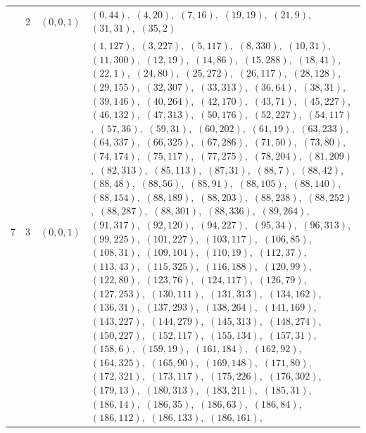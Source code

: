 \documentclass[11pt]{article}
\begin{document}
\begin{longtable}{@{}rrl>{\raggedright\arraybackslash}p{}@{}}
\addlinespace[3pt]
7 & 2 & $(0,0,1)$ & $(0,44)$,\allowbreak\ $(4,20)$,\allowbreak\ $(7,16)$,\allowbreak\ $(19,19)$,\allowbreak\ $(21,9)$,\allowbreak\ $(31,31)$,\allowbreak\ $(35,2)$\\
7 & 3 & $(0,0,1)$ & $(1,127)$,\allowbreak\ $(3,227)$,\allowbreak\ $(5,117)$,\allowbreak\ $(8,330)$,\allowbreak\ $(10,31)$,\allowbreak\ $(11,300)$,\allowbreak\ $(12,19)$,\allowbreak\ $(14,86)$,\allowbreak\ $(15,288)$,\allowbreak\ $(18,41)$,\allowbreak\ $(22,1)$,\allowbreak\ $(24,80)$,\allowbreak\ $(25,272)$,\allowbreak\ $(26,117)$,\allowbreak\ $(28,128)$,\allowbreak\ $(29,155)$,\allowbreak\ $(32,307)$,\allowbreak\ $(33,313)$,\allowbreak\ $(36,64)$,\allowbreak\ $(38,31)$,\allowbreak\ $(39,146)$,\allowbreak\ $(40,264)$,\allowbreak\ $(42,170)$,\allowbreak\ $(43,71)$,\allowbreak\ $(45,227)$,\allowbreak\ $(46,132)$,\allowbreak\ $(47,313)$,\allowbreak\ $(50,176)$,\allowbreak\ $(52,227)$,\allowbreak\ $(54,117)$,\allowbreak\ $(57,36)$,\allowbreak\ $(59,31)$,\allowbreak\ $(60,202)$,\allowbreak\ $(61,19)$,\allowbreak\ $(63,233)$,\allowbreak\ $(64,337)$,\allowbreak\ $(66,325)$,\allowbreak\ $(67,286)$,\allowbreak\ $(71,50)$,\allowbreak\ $(73,80)$,\allowbreak\ $(74,174)$,\allowbreak\ $(75,117)$,\allowbreak\ $(77,275)$,\allowbreak\ $(78,204)$,\allowbreak\ $(81,209)$,\allowbreak\ $(82,313)$,\allowbreak\ $(85,113)$,\allowbreak\ $(87,31)$,\allowbreak\ $(88,7)$,\allowbreak\ $(88,42)$,\allowbreak\ $(88,48)$,\allowbreak\ $(88,56)$,\allowbreak\ $(88,91)$,\allowbreak\ $(88,105)$,\allowbreak\ $(88,140)$,\allowbreak\ $(88,154)$,\allowbreak\ $(88,189)$,\allowbreak\ $(88,203)$,\allowbreak\ $(88,238)$,\allowbreak\ $(88,252)$,\allowbreak\ $(88,287)$,\allowbreak\ $(88,301)$,\allowbreak\ $(88,336)$,\allowbreak\ $(89,264)$,\allowbreak\ $(91,317)$,\allowbreak\ $(92,120)$,\allowbreak\ $(94,227)$,\allowbreak\ $(95,34)$,\allowbreak\ $(96,313)$,\allowbreak\ $(99,225)$,\allowbreak\ $(101,227)$,\allowbreak\ $(103,117)$,\allowbreak\ $(106,85)$,\allowbreak\ $(108,31)$,\allowbreak\ $(109,104)$,\allowbreak\ $(110,19)$,\allowbreak\ $(112,37)$,\allowbreak\ $(113,43)$,\allowbreak\ $(115,325)$,\allowbreak\ $(116,188)$,\allowbreak\ $(120,99)$,\allowbreak\ $(122,80)$,\allowbreak\ $(123,76)$,\allowbreak\ $(124,117)$,\allowbreak\ $(126,79)$,\allowbreak\ $(127,253)$,\allowbreak\ $(130,111)$,\allowbreak\ $(131,313)$,\allowbreak\ $(134,162)$,\allowbreak\ $(136,31)$,\allowbreak\ $(137,293)$,\allowbreak\ $(138,264)$,\allowbreak\ $(141,169)$,\allowbreak\ $(143,227)$,\allowbreak\ $(144,279)$,\allowbreak\ $(145,313)$,\allowbreak\ $(148,274)$,\allowbreak\ $(150,227)$,\allowbreak\ $(152,117)$,\allowbreak\ $(155,134)$,\allowbreak\ $(157,31)$,\allowbreak\ $(158,6)$,\allowbreak\ $(159,19)$,\allowbreak\ $(161,184)$,\allowbreak\ $(162,92)$,\allowbreak\ $(164,325)$,\allowbreak\ $(165,90)$,\allowbreak\ $(169,148)$,\allowbreak\ $(171,80)$,\allowbreak\ $(172,321)$,\allowbreak\ $(173,117)$,\allowbreak\ $(175,226)$,\allowbreak\ $(176,302)$,\allowbreak\ $(179,13)$,\allowbreak\ $(180,313)$,\allowbreak\ $(183,211)$,\allowbreak\ $(185,31)$,\allowbreak\ $(186,14)$,\allowbreak\ $(186,35)$,\allowbreak\ $(186,63)$,\allowbreak\ $(186,84)$,\allowbreak\ $(186,112)$,\allowbreak\ $(186,133)$,\allowbreak\ $(186,161)$,\allowbreak\ 
\end{longtable}
\end{document}
